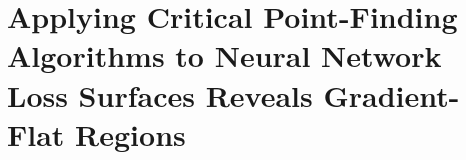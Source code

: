 \documentclass[../../thesis.tex]{subfiles}
\begin{document}
\chapter{Applying Critical Point-Finding Algorithms to Neural Network Loss Surfaces
Reveals Gradient-Flat Regions}

\onlyinsubfile{\printbibliography}
\end{document}
